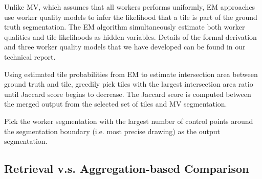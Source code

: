 
Unlike MV, which assumes that all workers performs uniformly, EM approaches use worker quality models to infer the likelihood that a tile is part of the ground truth segmentation. The EM algorithm simultaneously estimate both worker qualities and tile likelihoods as hidden variables. Details of the formal derivation and three worker quality models that we have developed can be found in our technical report.


Using estimated tile probabilities from EM to estimate intersection area between ground truth and tile, greedily pick tiles with the largest intersection area ratio until Jaccard score begins to decrease. The Jaccard score is computed between the merged output from the selected set of tiles and MV segmentation.


Pick the worker segmentation with the largest number of control points around the segmentation boundary (i.e. most precise drawing) as the output segmentation.

\subsection{Retrieval v.s. Aggregation-based Comparison}


